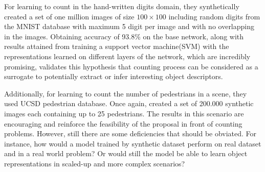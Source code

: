 For learning to count in the hand-written digits domain, they synthetically created a set of one million images of size $100\times100$ including random digits from the MNIST database with maximum 5 digit per image and with no overlapping in the images. Obtaining accuracy of 93.8\% on the base network, along with results attained from training a support vector machine(SVM) with the representations learned on different layers of the network, which are incredibly promising, validates this hypothesis that counting process can be considered as a surrogate to potentially extract or infer interesting object descriptors\cite{segui2015learning}. 

Additionally, for learning to count the number of pedestrians in a scene, they used UCSD pedestrian database\cite{chan2008privacy}. Once again, \citealt*{segui2015learning} created a set of 200.000 synthetic images each containing up to 25 pedestrians. The results in this scenario are encouraging and reinforce the feasibility of the proposal in front of counting problems. However, still there are some deficiencies that should be obviated. For instance, how would a model trained by synthetic dataset perform on real dataset and in a real world problem? Or would still the model be able to learn object representations in scaled-up and more complex scenarios?





